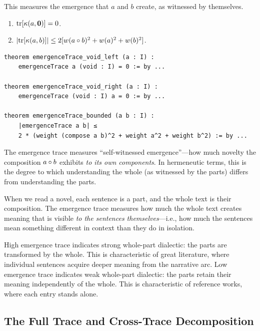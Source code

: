 This measures the emergence that $a$ and $b$ create, as witnessed by themselves.

\begin{theorem}
\label{thm:emergence-trace-properties}
\begin{enumerate}
  \item $\mathrm{tr}[\kappa(a, \mathbf{0})] = 0$.
  \item $|\mathrm{tr}[\kappa(a, b)]| \leq 2[w(a \circ b)^2 + w(a)^2 + w(b)^2]$.
\end{enumerate}
\end{theorem}

\begin{lstlisting}[caption={Emergence trace (IDT\_v3\_Emergence.lean)}]
theorem emergenceTrace_void_left (a : I) :
    emergenceTrace a (void : I) = 0 := by ...
    
theorem emergenceTrace_void_right (a : I) :
    emergenceTrace (void : I) a = 0 := by ...
    
theorem emergenceTrace_bounded (a b : I) :
    |emergenceTrace a b| ≤
    2 * (weight (compose a b)^2 + weight a^2 + weight b^2) := by ...
\end{lstlisting}

\begin{interpretation}
The emergence trace measures ``self-witnessed emergence''---how much novelty
the composition $a \circ b$ exhibits \emph{to its own components}. In
hermeneutic terms, this is the degree to which understanding the whole (as
witnessed by the parts) differs from understanding the parts.

When we read a novel, each sentence is a part, and the whole text is their
composition. The emergence trace measures how much the whole text creates
meaning that is visible \emph{to the sentences themselves}---i.e., how much
the sentences mean something different in context than they do in isolation.

High emergence trace indicates strong whole-part dialectic: the parts are
transformed by the whole. This is characteristic of great literature, where
individual sentences acquire deeper meaning from the narrative arc. Low
emergence trace indicates weak whole-part dialectic: the parts retain their
meaning independently of the whole. This is characteristic of reference works,
where each entry stands alone.
\end{interpretation}

\subsection{The Full Trace and Cross-Trace Decomposition}

